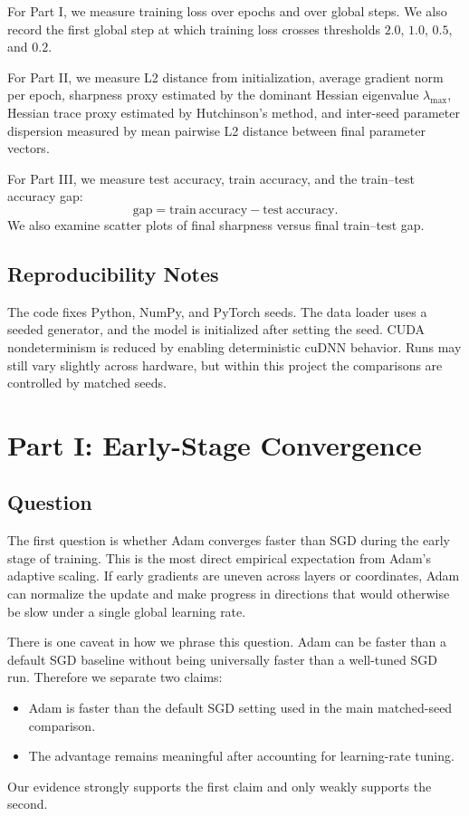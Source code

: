 \documentclass[11pt]{article}
\begin{document}
For Part I, we measure training loss over epochs and over global steps. We also record the first global step at which training loss crosses thresholds $2.0$, $1.0$, $0.5$, and $0.2$.

For Part II, we measure L2 distance from initialization, average gradient norm per epoch, sharpness proxy estimated by the dominant Hessian eigenvalue $\lambda_{\max}$, Hessian trace proxy estimated by Hutchinson's method, and inter-seed parameter dispersion measured by mean pairwise L2 distance between final parameter vectors.

For Part III, we measure test accuracy, train accuracy, and the train--test accuracy gap:
\[
\mathrm{gap} = \mathrm{train\ accuracy} - \mathrm{test\ accuracy}.
\]
We also examine scatter plots of final sharpness versus final train--test gap.

\subsection{Reproducibility Notes}

The code fixes Python, NumPy, and PyTorch seeds. The data loader uses a seeded generator, and the model is initialized after setting the seed. CUDA nondeterminism is reduced by enabling deterministic cuDNN behavior. Runs may still vary slightly across hardware, but within this project the comparisons are controlled by matched seeds.

\section{Part I: Early-Stage Convergence}

\subsection{Question}

The first question is whether Adam converges faster than SGD during the early stage of training. This is the most direct empirical expectation from Adam's adaptive scaling. If early gradients are uneven across layers or coordinates, Adam can normalize the update and make progress in directions that would otherwise be slow under a single global learning rate.

There is one caveat in how we phrase this question. Adam can be faster than a default SGD baseline without being universally faster than a well-tuned SGD run. Therefore we separate two claims:
\begin{itemize}
    \item Adam is faster than the default SGD setting used in the main matched-seed comparison.
    \item The advantage remains meaningful after accounting for learning-rate tuning.
\end{itemize}
Our evidence strongly supports the first claim and only weakly supports the second.
\end{document}
